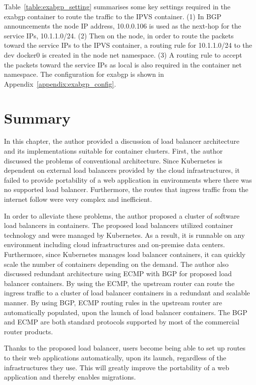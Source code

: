 Table~\ref{table:exabgp_setting} summarises some key settings required in the exabgp container to route the traffic to the IPVS container.
(1) In BGP announcements the node IP address, 10.0.0.106 is used as the next-hop for the service IPs, 10.1.1.0/24.
(2) Then on the node, in order to route the packets toward the service IPs to the IPVS container, 
a routing rule for 10.1.1.0/24 to the dev docker0 is created in the node net namespace. 
(3) A routing rule to accept the packets toward the service IPs as local is also required in the container net namespace. 
The configuration for exabgp is shown in Appendix~\ref{appendix:exabgp_config}.

\FloatBarrier


\section{Summary}

In this chapter, the author provided a discussion of load balancer architecture and its implementations suitable for container clusters.
%
First, the author discussed the problems of conventional architecture.
Since Kubernetes is dependent on external load balancers provided by the cloud infrastructures,
it failed to provide portability of a web application in environments where there was no supported load balancer.
Furthermore, the routes that ingress traffic from the internet follow were very complex and inefficient.

In order to alleviate these problems, the author proposed a cluster of software load balancers in containers.
The proposed load balancers utilized container technology and were managed by Kubernetes.
As a result, it is runnable on any environment including cloud infrastructures and on-premise data centers.
Furthermore, since Kubernetes manages load balancer containers, it can quickly scale the number of containers depending on the demand.
%
The author also discussed redundant architecture using ECMP with BGP for proposed load balancer containers.
By using the ECMP, the upstream router can route the ingress traffic to a cluster of load balancer containers in a redundant and scalable manner.
By using BGP, ECMP routing rules in the upstream router are automatically populated, upon the launch of load balancer containers.
The BGP and ECMP are both standard protocols supported by most of the commercial router products.

Thanks to the proposed load balancer, users become being able to set up routes to their web applications automatically, upon its launch, regardless of the infrastructures they use.  
This will greatly improve the portability of a web application and thereby enables migrations.




